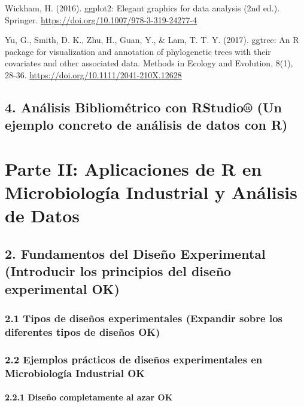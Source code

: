 \documentclass[
  letterpaper,
  DIV=11,
  numbers=noendperiod]{scrreprt}
\begin{document}
Wickham, H. (2016). ggplot2: Elegant graphics for data analysis (2nd
ed.). Springer. \url{https://doi.org/10.1007/978-3-319-24277-4}

Yu, G., Smith, D. K., Zhu, H., Guan, Y., \& Lam, T. T. Y. (2017).
ggtree: An R package for visualization and annotation of phylogenetic
trees with their covariates and other associated data. Methods in
Ecology and Evolution, 8(1), 28-36.
\url{https://doi.org/10.1111/2041-210X.12628}

\section{4. Análisis Bibliométrico con RStudio® (Un ejemplo concreto de
análisis de datos con
R)}\label{anuxe1lisis-bibliomuxe9trico-con-rstudio-un-ejemplo-concreto-de-anuxe1lisis-de-datos-con-r}


\chapter{Parte II: Aplicaciones de R en Microbiología Industrial y
Análisis de
Datos}\label{parte-ii-aplicaciones-de-r-en-microbiologuxeda-industrial-y-anuxe1lisis-de-datos}

\section{2. Fundamentos del Diseño Experimental (Introducir los
principios del diseño experimental
OK)}\label{fundamentos-del-diseuxf1o-experimental-introducir-los-principios-del-diseuxf1o-experimental-ok}

\subsection{2.1 Tipos de diseños experimentales (Expandir sobre los
diferentes tipos de diseños
OK)}\label{tipos-de-diseuxf1os-experimentales-expandir-sobre-los-diferentes-tipos-de-diseuxf1os-ok}

\subsection{2.2 Ejemplos prácticos de diseños experimentales en
Microbiología Industrial
OK}\label{ejemplos-pruxe1cticos-de-diseuxf1os-experimentales-en-microbiologuxeda-industrial-ok}

\subsubsection{2.2.1 Diseño completamente al azar
OK}\label{diseuxf1o-completamente-al-azar-ok}
\end{document}
